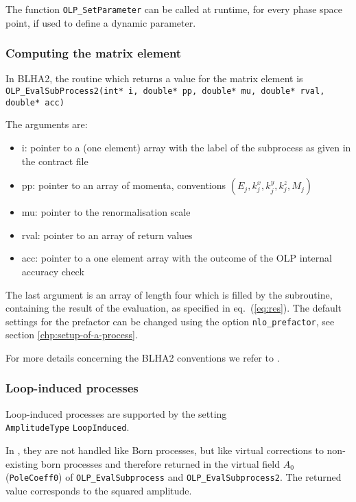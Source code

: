The function {\tt OLP\_SetParameter} can be called at runtime, 
for every phase space point, 
if used to define a dynamic parameter. 

\subsubsection{Computing the matrix element}

In BLHA2, the routine which returns a value for the matrix element is\\
{\small {\tt OLP\_EvalSubProcess2(int* i, double* pp, double* mu, double* rval, double* acc)}}


The arguments are:
\begin{itemize}
\item i: pointer to a (one element) array with the label of the subprocess as given in the contract file
\item pp: pointer to an array of momenta, conventions $(E_j,k_j^x,k_j^y,k_j^z,M_j)$
\item mu: pointer to the renormalisation scale 
\item rval: pointer to an array of return values
\item acc: pointer to a one element array with the outcome of the 
OLP internal accuracy check 
\end{itemize}


The last argument is an array of length four which is filled by the subroutine, 
containing the result of the evaluation, as specified in eq.~(\ref{eq:res}).
The default settings for the prefactor can be changed using the option {\tt nlo\_prefactor}, 
see section \ref{chp:setup-of-a-process}.

For more details concerning the BLHA2 conventions we refer to \cite{Alioli:2013nda}.

\subsubsection{Loop-induced processes}

Loop-induced processes are supported by the setting \\
\texttt{AmplitudeType} \texttt{LoopInduced}.

In \gosam, they are not handled like Born processes, but like virtual corrections to non-existing born processes
and therefore returned in the virtual field $A_0$ (\texttt{PoleCoeff0}) of \texttt{OLP\_EvalSubprocess}
and \texttt{OLP\_EvalSubprocess2}. The returned value corresponds to
the  squared amplitude.

